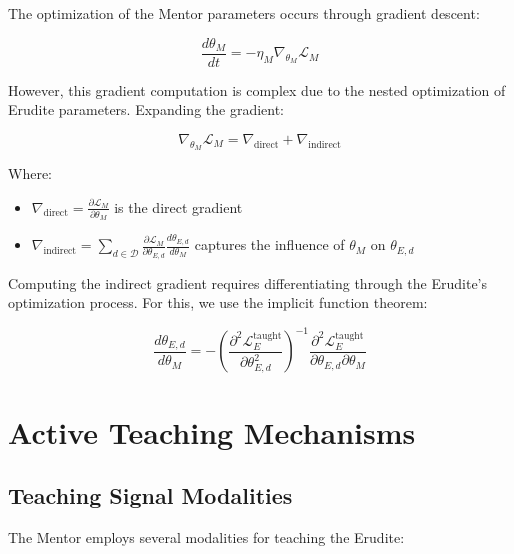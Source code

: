 The optimization of the Mentor parameters occurs through gradient descent:

\begin{equation}
\frac{d\theta_M}{dt} = -\eta_M \nabla_{\theta_M} \mathcal{L}_M
\end{equation}

However, this gradient computation is complex due to the nested optimization of Erudite parameters. Expanding the gradient:

\begin{equation}
\nabla_{\theta_M} \mathcal{L}_M = \nabla_{\text{direct}} + \nabla_{\text{indirect}}
\end{equation}

Where:
\begin{itemize}
\item $\nabla_{\text{direct}} = \frac{\partial \mathcal{L}_M}{\partial \theta_M}$ is the direct gradient
\item $\nabla_{\text{indirect}} = \sum_{d \in \mathcal{D}} \frac{\partial \mathcal{L}_M}{\partial \theta_{E,d}} \frac{d\theta_{E,d}}{d\theta_M}$ captures the influence of $\theta_M$ on $\theta_{E,d}$
\end{itemize}

Computing the indirect gradient requires differentiating through the Erudite's optimization process. For this, we use the implicit function theorem:

\begin{equation}
\frac{d\theta_{E,d}}{d\theta_M} = -\left(\frac{\partial^2 \mathcal{L}_{E}^{\text{taught}}}{\partial \theta_{E,d}^2}\right)^{-1} \frac{\partial^2 \mathcal{L}_{E}^{\text{taught}}}{\partial \theta_{E,d} \partial \theta_M}
\end{equation}

\section{Active Teaching Mechanisms}

\subsection{Teaching Signal Modalities}

The Mentor employs several modalities for teaching the Erudite:

